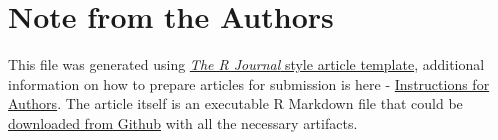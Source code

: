 \hypertarget{note-from-the-authors}{%
\section{Note from the Authors}\label{note-from-the-authors}}

This file was generated using
\href{https://github.com/rstudio/rticles}{\emph{The R Journal} style
article template}, additional information on how to prepare articles for
submission is here -
\href{https://journal.r-project.org/share/author-guide.pdf}{Instructions
for Authors}. The article itself is an executable R Markdown file that
could be
\href{https://github.com/ivbsoftware/big-data-final-2/blob/master/docs/R_Journal/big-data-final-2/}{downloaded
from Github} with all the necessary artifacts.


\address{%
Vadim Spirkov\\
York University School of Continuing Studies\\
\\
}


\address{%
Murlidhar Loka\\
York University School of Continuing Studies\\
\\
}


